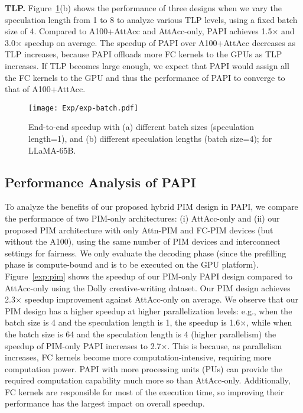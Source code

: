 \noindent\textbf{TLP.} Figure~\ref{exp:batch}(b) shows the performance of three designs when we vary the speculation length from 1 to 8 to analyze various TLP levels, using a fixed batch size of 4.
Compared to A100+AttAcc and AttAcc-only, PAPI achieves 1.5× and 3.0× speedup on average. The speedup of PAPI over A100+AttAcc decreases as TLP increases, because PAPI offloads more FC kernels to the GPUs as TLP increases. If TLP becomes large enough, we expect that PAPI would assign all the FC kernels to the GPU and thus the performance of PAPI to converge to that of A100+AttAcc.


\begin{figure}[h]
\centering
\texttt{[image: Exp/exp-batch.pdf]}
\caption{End-to-end speedup with (a) different batch sizes (speculation length=1), and (b) different speculation lengths (batch size=4); for LLaMA-65B.}
\label{exp:batch}
\end{figure}

\subsection{Performance Analysis of PAPI}
\label{sec:7.4}
To analyze the benefits of our proposed hybrid PIM design in PAPI, we compare the performance of two PIM-only architectures: (i) AttAcc-only and (ii) our proposed PIM architecture with only Attn-PIM and FC-PIM devices (but without the A100), using the same number of PIM devices and interconnect settings for fairness.
We only evaluate the decoding phase (since the prefilling phase is compute-bound and is to be executed on the GPU platform).
Figure~\ref{exp:pim} shows the speedup of our PIM-only PAPI design compared to AttAcc-only using the Dolly creative-writing dataset. Our PIM design achieves 2.3× speedup improvement against AttAcc-only on average. We observe that our PIM design has a higher speedup at higher parallelization levels: e.g., when the batch size is 4 and the speculation length is 1, the speedup is 1.6×, while when the batch size is 64 and the speculation length is 4 (higher parallelism) the speedup of PIM-only PAPI increases to 2.7×. This is because, as parallelism increases, FC kernels become more computation-intensive, requiring more computation power. PAPI with more processing units (PUs) can provide the required computation capability much more so than AttAcc-only. Additionally, FC kernels are responsible for most of the execution time, so improving their performance has the largest impact on overall speedup.


